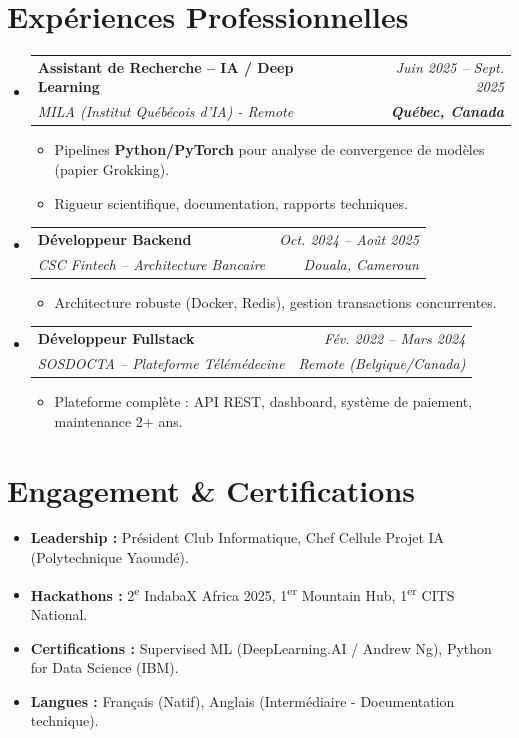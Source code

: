 \documentclass[a4paper,11pt]{article}
\makeatletter
\newcommand{\resumeSubheading}[4]{
  \vspace{-1pt}\item
    \begin{tabular*}{0.97\textwidth}[t]{l@{\extracolsep{\fill}}r}
      \textbf{#1} & \textit{\small #2} \\
      \textit{\small #3} & \textit{\small #4} \\
    \end{tabular*}\vspace{-5pt}
}
\makeatother
\begin{document}
\section{Expériences Professionnelles}
\begin{itemize}[leftmargin=*, label={}]

    \resumeSubheading
      {Assistant de Recherche -- IA / Deep Learning}{Juin 2025 -- Sept. 2025}
      {MILA (Institut Québécois d'IA) - Remote}{\textbf{Québec, Canada}}
      \begin{itemize}[leftmargin=0.4cm, nosep, label=\tiny$\bullet$]
        \item \small{Pipelines \textbf{Python/PyTorch} pour analyse de convergence de modèles (papier Grokking).}
        \item \small{Rigueur scientifique, documentation, rapports techniques.}
      \end{itemize}
    \vspace{2pt}

    \resumeSubheading
      {Développeur Backend}{Oct. 2024 -- Août 2025}
      {CSC Fintech -- Architecture Bancaire}{Douala, Cameroun}
      \begin{itemize}[leftmargin=0.4cm, nosep, label=\tiny$\bullet$]
        \item \small{Architecture robuste (Docker, Redis), gestion transactions concurrentes.}
      \end{itemize}
    \vspace{2pt}

    \resumeSubheading
      {Développeur Fullstack}{Fév. 2022 -- Mars 2024}
      {SOSDOCTA -- Plateforme Télémédecine}{Remote (Belgique/Canada)}
      \begin{itemize}[leftmargin=0.4cm, nosep, label=\tiny$\bullet$]
        \item \small{Plateforme complète : API REST, dashboard, système de paiement, maintenance 2+ ans.}
      \end{itemize}
\end{itemize}

\section{Engagement \& Certifications}
\begin{itemize}[leftmargin=*, nosep]
    \item \textbf{Leadership :} Président Club Informatique, Chef Cellule Projet IA (Polytechnique Yaoundé).
    \item \textbf{Hackathons :} 2\textsuperscript{e} IndabaX Africa 2025, 1\textsuperscript{er} Mountain Hub, 1\textsuperscript{er} CITS National.
    \item \textbf{Certifications :} Supervised ML (DeepLearning.AI / Andrew Ng), Python for Data Science (IBM).
    \item \textbf{Langues :} Français (Natif), Anglais (Intermédiaire - Documentation technique).
\end{itemize}
\end{document}
